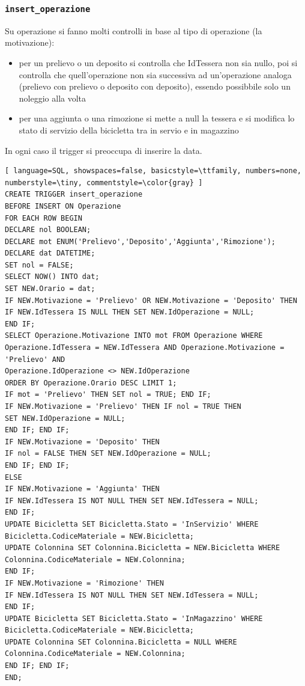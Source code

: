 \documentclass[a4paper,twoside]{article}
\begin{document}
\subsubsection{\texttt{insert\_operazione}}
Su operazione si fanno molti controlli in base al tipo di operazione (la motivazione):
\begin{itemize}
 \item per un prelievo o un deposito si controlla che IdTessera non sia nullo, poi si controlla che quell'operazione non sia successiva ad un'operazione analoga (prelievo con prelievo o deposito con deposito), essendo possibbile solo un noleggio alla volta
 \item per una aggiunta o una rimozione si mette a null la tessera e si modifica lo stato di servizio della bicicletta tra in servio e in magazzino
\end{itemize}
In ogni caso il trigger si preoccupa di inserire la data.
\begin{lstlisting}[ language=SQL, showspaces=false, basicstyle=\ttfamily, numbers=none, numberstyle=\tiny, commentstyle=\color{gray} ]
CREATE TRIGGER insert_operazione
BEFORE INSERT ON Operazione
FOR EACH ROW BEGIN
DECLARE nol BOOLEAN;
DECLARE mot ENUM('Prelievo','Deposito','Aggiunta','Rimozione');
DECLARE dat DATETIME;
SET nol = FALSE;
SELECT NOW() INTO dat;
SET NEW.Orario = dat;
IF NEW.Motivazione = 'Prelievo' OR NEW.Motivazione = 'Deposito' THEN
IF NEW.IdTessera IS NULL THEN SET NEW.IdOperazione = NULL;
END IF;
SELECT Operazione.Motivazione INTO mot FROM Operazione WHERE
Operazione.IdTessera = NEW.IdTessera AND Operazione.Motivazione = 'Prelievo' AND
Operazione.IdOperazione <> NEW.IdOperazione
ORDER BY Operazione.Orario DESC LIMIT 1;
IF mot = 'Prelievo' THEN SET nol = TRUE; END IF;
IF NEW.Motivazione = 'Prelievo' THEN IF nol = TRUE THEN
SET NEW.IdOperazione = NULL;
END IF; END IF;
IF NEW.Motivazione = 'Deposito' THEN
IF nol = FALSE THEN SET NEW.IdOperazione = NULL;
END IF; END IF;
ELSE
IF NEW.Motivazione = 'Aggiunta' THEN
IF NEW.IdTessera IS NOT NULL THEN SET NEW.IdTessera = NULL;
END IF;
UPDATE Bicicletta SET Bicicletta.Stato = 'InServizio' WHERE
Bicicletta.CodiceMateriale = NEW.Bicicletta;
UPDATE Colonnina SET Colonnina.Bicicletta = NEW.Bicicletta WHERE
Colonnina.CodiceMateriale = NEW.Colonnina;
END IF;
IF NEW.Motivazione = 'Rimozione' THEN
IF NEW.IdTessera IS NOT NULL THEN SET NEW.IdTessera = NULL;
END IF;
UPDATE Bicicletta SET Bicicletta.Stato = 'InMagazzino' WHERE
Bicicletta.CodiceMateriale = NEW.Bicicletta;
UPDATE Colonnina SET Colonnina.Bicicletta = NULL WHERE
Colonnina.CodiceMateriale = NEW.Colonnina;
END IF; END IF;
END;
\end{lstlisting}
\end{document}

